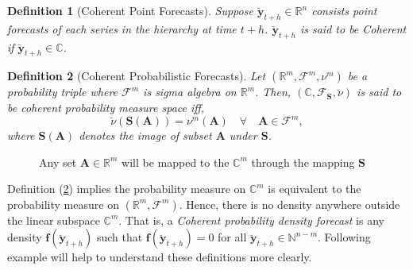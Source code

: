 \documentclass[a4paper, 11pt]{article}
\newtheorem{definition}{Definition}[section]
\begin{document}
\begin{definition}[Coherent Point Forecasts]\label{def:cohpoint}
	Suppose $\bm{\breve{y}}_{t+h} \in \mathbb{R}^n$ consists point forecasts of each series in the hierarchy at time $t+h$.  $\bm{\breve{y}}_{t+h}$ is said to be \textit{Coherent} if $\bm{\breve{y}}_{t+h} \in \bm{\mathbb{C}}$. 
\end{definition}

\begin{definition}[Coherent Probabilistic Forecasts]\label{def:cohprob}
	Let $(\bm{\mathbb{R}}^m, \bm{\mathscr{F}}^m, \nu^m)$ be a probability triple where $\mathscr{F}^m$ is sigma algebra on $\bm{\mathbb{R}}^m$. Then, $(\bm{\mathbb{C}}, \mathscr{F}_{\bm{S}}, \breve{\nu})$ is said to be coherent probability measure space iff, 
	$$\breve{\nu}(\bm{S}(\bm{A})) = \nu^m(\bm{A}) \quad \forall \quad \bm{A} \in \mathscr{F}^m,$$ 
	where $\bm{S}(\bm{A})$ denotes the image of subset $\bm{A}$ under $\bm{S}$. 
\end{definition}

\begin{figure}[H]
	\begin{center}
		\newline
	\end{center}
	\caption{Any set $\bm{A} \in \mathbb{R}^m$ will be mapped to the $\bm{\mathbb{C}}^m$ through the mapping $\bm{S}$}
\end{figure}

Definition (\ref{def:cohprob}) implies the probability measure on $\bm{\mathbb{C}}^m$ is equivalent to the probability measure on $(\bm{\mathbb{R}}^m, \bm{\mathscr{F}}^m)$. Hence, there is no density anywhere outside the linear subspace $\bm{\mathbb{C}}^m$. That is, a \textit{Coherent probability density forecast} is any density $\bm{f}(\bm{\breve{y}}_{t+h})$ such that $\bm{f}(\bm{\breve{y}}_{t+h})=0$ for all $\bm{\breve{y}}_{t+h} \in \bm{\mathbb{N}}^{n-m}$. Following example will help to understand these definitions more clearly.
\end{document}
